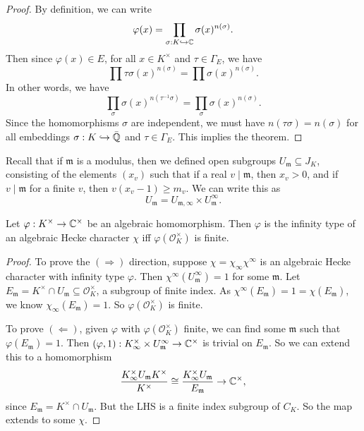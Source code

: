 \documentclass[a4paper]{article}
\begin{document}
\begin{proof}
  By definition, we can write
  \[
    \varphi(x) = \prod_{\sigma : K \hookrightarrow \mathbb{C}} \sigma(x)^{n(\sigma)}.
  \]
  Then since $\varphi(x) \in E$, for all $x \in K^\times$ and $\tau \in \Gamma_E$, we have
  \[
    \prod \tau \sigma(x) ^{n(\sigma)} = \prod \sigma(x)^{n(\sigma)}.
  \]
  In other words, we have
  \[
    \prod_\sigma \sigma(x)^{n(\tau^{-1} \sigma)} = \prod_\sigma \sigma(x)^{n(\sigma)}.
  \]
  Since the homomorphisms $\sigma$ are independent, we must have $n(\tau \sigma) = n (\sigma)$ for all embeddings $\sigma: K \hookrightarrow \bar{\mathbb{Q}}$ and $\tau \in \Gamma_E$. This implies the theorem.
\end{proof}

Recall that if $\mathfrak{m}$ is a modulus, then we defined open subgroups $U_\mathfrak{m} \subseteq J_K$, consisting of the elements $(x_v)$ such that if a real $v \mid \mathfrak{m}$, then $x_v > 0$, and if $v \mid \mathfrak{m}$ for a finite $v$, then $v(x_v - 1) \geq m_v$. We can write this as
\[
  U_\mathfrak{m} = U_{\mathfrak{m}, \infty} \times U_{\mathfrak{m}}^\infty.
\]
\begin{prop}
  Let $\varphi: K^\times \to \mathbb{C}^\times$ be an algebraic homomorphism. Then $\varphi$ is the infinity type of an algebraic Hecke character $\chi$ iff $\varphi(\mathcal{O}_K^\times)$ is finite.
\end{prop}

\begin{proof}
  To prove the $(\Rightarrow)$ direction, suppose $\chi = \chi_\infty \chi^\infty$ is an algebraic Hecke character with infinity type $\varphi$. Then $\chi^\infty(U_\mathfrak{m}^\infty) = 1$ for some $\mathfrak{m}$. Let $E_\mathfrak{m} = K^\times \cap U_\mathfrak{m} \subseteq \mathcal{O}_K^\times$, a subgroup of finite index. As $\chi^\infty(E_\mathfrak{m}) = 1 = \chi(E_\mathfrak{m})$, we know $\chi_\infty(E_\mathfrak{m}) = 1$. So $\varphi(\mathcal{O}_K^\times)$ is finite.

  To prove $(\Leftarrow)$, given $\varphi$ with $\varphi(\mathcal{O}_K^\times)$ finite, we can find some $\mathfrak{m}$ such that $\varphi(E_\mathfrak{m}) = 1$. Then $(\varphi, 1): K_\infty^\times \times U_\mathfrak{m}^\infty \to \mathbb{C}^\times$ is trivial on $E_\mathfrak{m}$. So we can extend this to a homomorphism
  \[
    \frac{K_\infty^\times U_\mathfrak{m} K^\times}{K^\times} \cong \frac{K_\infty^\times U_\mathfrak{m}}{E_\mathfrak{m}} \to \mathbb{C}^\times,
  \]
  since $E_\mathfrak{m} = K^\times \cap U_\mathfrak{m}$. But the LHS is a finite index subgroup of $C_K$. So the map extends to some $\chi$.
\end{proof}
\end{document}
